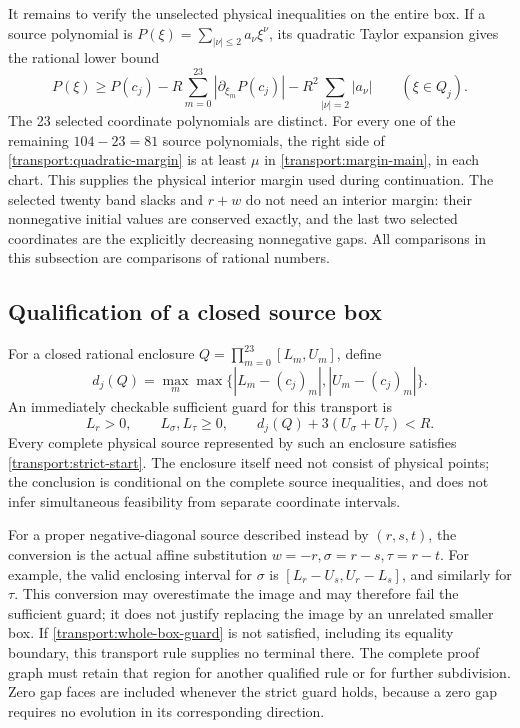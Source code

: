 \documentclass[11pt,reqno]{amsart}
\theoremstyle{definition}
\theoremstyle{remark}
\begin{document}
It remains to verify the unselected physical inequalities on the
entire box.  If a source polynomial is
\(P(\xi)=\sum_{|\nu|\le2}a_\nu\xi^\nu\), its quadratic Taylor
expansion gives the rational lower bound
\begin{equation}\label{transport:quadratic-margin}
P(\xi)\ge P(c_j)-R\sum_{m=0}^{23}
 |\partial_{\xi_m}P(c_j)|
 -R^2\sum_{|\nu|=2}|a_\nu|\qquad(\xi\in Q_j).
\end{equation}
The 23 selected coordinate polynomials are distinct.  For every one
of the remaining \(104-23=81\) source polynomials, the right side of
\eqref{transport:quadratic-margin} is at least \(\mu\) in
\eqref{transport:margin-main}, in each chart.  This supplies the
physical interior margin used during continuation.  The selected
twenty band slacks and \(r+w\) do not need an interior margin:
their nonnegative initial values are conserved exactly, and the last
two selected coordinates are the explicitly decreasing nonnegative
gaps.  All comparisons in this subsection are comparisons of
rational numbers.

\subsection{Qualification of a closed source box}
\label{transport:terminal-detail}
For a closed rational enclosure
\(Q=\prod_{m=0}^{23}[L_m,U_m]\), define
\[
d_j(Q)=\max_m\max\{|L_m-(c_j)_m|,|U_m-(c_j)_m|\}.
\]
An immediately checkable sufficient guard for this transport is
\begin{equation}\label{transport:whole-box-guard}
L_r>0,\qquad L_\sigma,L_\tau\ge0,\qquad
d_j(Q)+3(U_\sigma+U_\tau)<R.
\end{equation}
Every complete physical source represented by such an enclosure
satisfies \eqref{transport:strict-start}.  The enclosure itself need
not consist of physical points; the conclusion is conditional on the
complete source inequalities, and does not infer simultaneous
feasibility from separate coordinate intervals.

For a proper negative-diagonal source described instead by
\((r,s,t)\), the conversion is the actual affine substitution
\(w=-r,\sigma=r-s,\tau=r-t\).  For example, the valid enclosing
interval for \(\sigma\) is \([L_r-U_s,U_r-L_s]\), and similarly
for \(\tau\).  This conversion may overestimate the image and may
therefore fail the sufficient guard; it does not justify replacing
the image by an unrelated smaller box.  If
\eqref{transport:whole-box-guard} is not satisfied, including its
equality boundary, this transport rule supplies no terminal there.
The complete proof graph must retain that region for another
qualified rule or for further subdivision.  Zero gap faces are
included whenever the strict guard holds, because a zero gap requires
no evolution in its corresponding direction.
\end{document}
